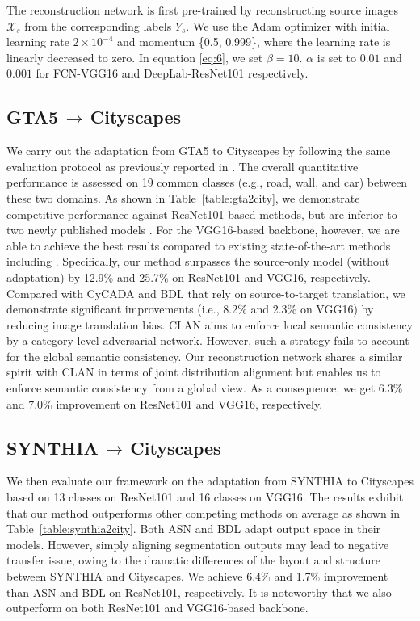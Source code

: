 \documentclass[runningheads]{llncs}
\begin{document}
	The reconstruction network is first pre-trained by reconstructing source images $ \mathcal{X}_{s} $ from the corresponding labels $ Y_s $. We use the Adam optimizer with initial learning rate $ 2\times10^{-4} $ and momentum \{0.5, 0.999\}, where the learning rate is linearly decreased to zero. In equation \ref{eq:6}, we set $ \beta=10 $. $ \alpha $ is set to $ 0.01 $ and $ 0.001 $ for FCN-VGG16 and DeepLab-ResNet101 respectively.
	
	
	\subsection{GTA5$\,\to\,$Cityscapes}


	We carry out the adaptation from GTA5 to Cityscapes by following the same evaluation protocol as previously reported in \cite{tsai2018learning,li2019bidirectional}. The overall quantitative performance is assessed on 19 common classes (e.g., road, wall, and car) between these two domains. As shown in Table~\ref{table:gta2city}, we demonstrate competitive performance against ResNet101-based methods, but are inferior to two newly published models \cite{kim2020learning,yang2020fda}. For the VGG16-based backbone, however, we are able to achieve the best results compared to existing state-of-the-art methods including \cite{kim2020learning,yang2020fda}. Specifically, our method surpasses the source-only model (without adaptation) by 12.9\% and 25.7\% on ResNet101 and VGG16, respectively. Compared with CyCADA \cite{hoffman2017cycada} and BDL \cite{li2019bidirectional} that rely on source-to-target translation, we demonstrate significant improvements (i.e., 8.2\% and 2.3\% on VGG16) by reducing image translation bias. CLAN \cite{luo2019taking} aims to enforce local semantic consistency by a category-level adversarial network. However, such a strategy fails to account for the global semantic consistency. Our reconstruction network shares a similar spirit with CLAN in terms of joint distribution alignment but enables us to enforce semantic consistency from a global view. As a consequence, we get 6.3\% and 7.0\% improvement on ResNet101 and VGG16, respectively. 
	
	\subsection{SYNTHIA$\,\to\,$Cityscapes}


	We then evaluate our framework on the adaptation from SYNTHIA to Cityscapes based on 13 classes on ResNet101 and 16 classes on VGG16. The results exhibit that our method outperforms other competing methods on average as shown in Table~\ref{table:synthia2city}. Both ASN \cite{tsai2018learning} and BDL \cite{li2019bidirectional} adapt output space in their models. However, simply aligning segmentation outputs may lead to negative transfer issue, owing to the dramatic differences of the layout and structure between SYNTHIA and Cityscapes. We achieve 6.4\% and 1.7\% improvement than ASN and BDL on ResNet101, respectively. It is noteworthy that we also outperform \cite{yang2020fda} on both ResNet101 and VGG16-based backbone.
	
\end{document}
